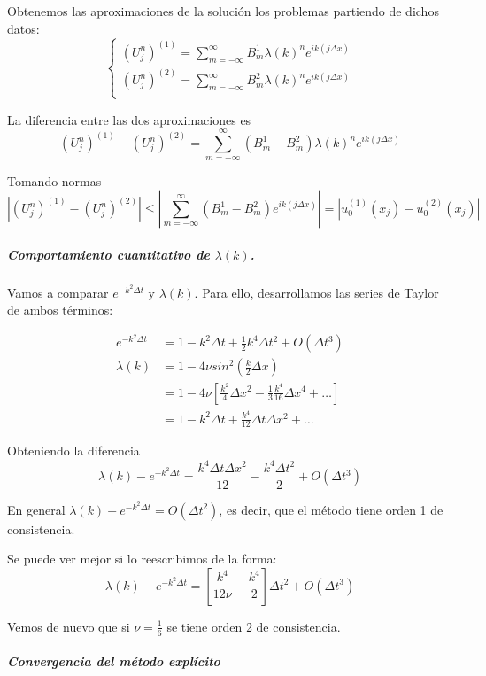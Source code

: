 Obtenemos las aproximaciones de la solución los problemas partiendo de dichos datos:
\begin{equation*}
\left\{
\begin{array}{l}
	(U_j^n)^{(1)} = \sum_{m=-\infty}^\infty B_m^1 \lambda(k)^n e^{ik(j\Delta x)}\\
	(U_j^n)^{(2)} = \sum_{m=-\infty}^\infty B_m^2 \lambda(k)^n e^{ik(j\Delta x)}\\
\end{array}
\right.
\end{equation*}

La diferencia entre las dos aproximaciones es
$$(U_j^n)^{(1)} - (U_j^n)^{(2)} = \sum_{m=-\infty}^\infty (B_m^1-B_m^2) \lambda(k)^n e^{ik(j\Delta x)}$$

Tomando normas
$$\left|(U_j^n)^{(1)}-(U_j^n)^{(2)}\right| \le \left|\sum_{m=-\infty}^\infty (B_m^1-B_m^2) e^{ik(j\Delta x)}\right| = \left|u_0^{(1)}(x_j)-u_0^{(2)}(x_j)\right|$$

\subparagraph*{Comportamiento cuantitativo de $\lambda(k)$.}\mbox{}

Vamos a comparar $e^{-k^2\Delta t}$ y $\lambda(k)$. Para ello, desarrollamos las series de Taylor de ambos términos:

\begin{align*}
		e^{-k^2\Delta t} & =  1-k^2\Delta t + \frac{1}{2}k^4\Delta t ^2 + O(\Delta t ^3)\\
		\lambda(k) & =  1-4\nu sin^2(\frac{k}{2}\Delta x)\\
		& =  1-4\nu\left[\frac{k^2}{4}\Delta x^2 - \frac{1}{3}\frac{k^4}{16}\Delta x^4 + \hdots \right]\\
		& =  1-k^2\Delta t + \frac{k^4}{12}\Delta t \Delta x^2 + \hdots
\end{align*}

Obteniendo la diferencia
$$\lambda(k) - e^{-k^2\Delta t} = \frac{k^4\Delta t \Delta x^2}{12} - \frac{k^4\Delta t^2}{2} + O(\Delta t ^3)$$

En general
$\lambda(k) - e^{-k^2\Delta t} = O(\Delta t^2)$, es decir, que el método tiene orden 1 de consistencia.

Se puede ver mejor si lo reescribimos de la forma:
$$\lambda(k) - e^{-k^2\Delta t} = \left[\frac{k^4}{12\nu}-\frac{k^4}{2}\right]\Delta t^2 + O(\Delta t^3)$$

Vemos de nuevo que si $\nu = \frac{1}{6}$ se tiene orden 2 de consistencia.

\subparagraph*{Convergencia del método explícito} \mbox{}


